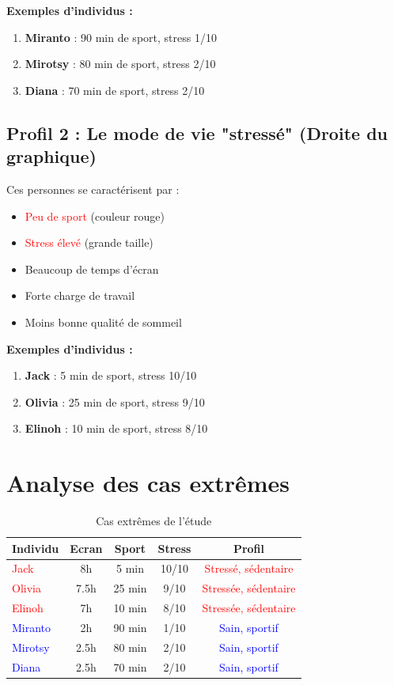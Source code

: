 \documentclass[12pt,a4paper]{book}
\begin{document}
	\textbf{Exemples d'individus :}
	\begin{enumerate}
		\item \textbf{Miranto} : 90 min de sport, stress 1/10
		\item \textbf{Mirotsy} : 80 min de sport, stress 2/10
		\item \textbf{Diana} : 70 min de sport, stress 2/10
	\end{enumerate}
	
	\subsection{Profil 2 : Le mode de vie "stressé" (Droite du graphique)}
	
	Ces personnes se caractérisent par :
	
	\begin{itemize}
		\item \textcolor{red}{Peu de sport} (couleur rouge)
		\item \textcolor{red}{Stress élevé} (grande taille)
		\item Beaucoup de temps d'écran
		\item Forte charge de travail
		\item Moins bonne qualité de sommeil
	\end{itemize}
	
	\textbf{Exemples d'individus :}
	\begin{enumerate}
		\item \textbf{Jack} : 5 min de sport, stress 10/10
		\item \textbf{Olivia} : 25 min de sport, stress 9/10
		\item \textbf{Elinoh} : 10 min de sport, stress 8/10
	\end{enumerate}
	
	\section{Analyse des cas extrêmes}
	
	\begin{table}[H]
		\centering
		\caption{Cas extrêmes de l'étude}
		\begin{tabular}{lcccc}
			\toprule
			\textbf{Individu} & \textbf{Ecran} & \textbf{Sport} & \textbf{Stress} & \textbf{Profil} \\
			\midrule
			\textcolor{red}{Jack} & 8h & 5 min & 10/10 & \textcolor{red}{Stressé, sédentaire} \\
			\textcolor{red}{Olivia} & 7.5h & 25 min & 9/10 & \textcolor{red}{Stressée, sédentaire} \\
			\textcolor{red}{Elinoh} & 7h & 10 min & 8/10 & \textcolor{red}{Stressée, sédentaire} \\
			\midrule
			\textcolor{blue}{Miranto} & 2h & 90 min & 1/10 & \textcolor{blue}{Sain, sportif} \\
			\textcolor{blue}{Mirotsy} & 2.5h & 80 min & 2/10 & \textcolor{blue}{Sain, sportif} \\
			\textcolor{blue}{Diana} & 2.5h & 70 min & 2/10 & \textcolor{blue}{Sain, sportif} \\
			\bottomrule
		\end{tabular}
	\end{table}
	
\end{document}
